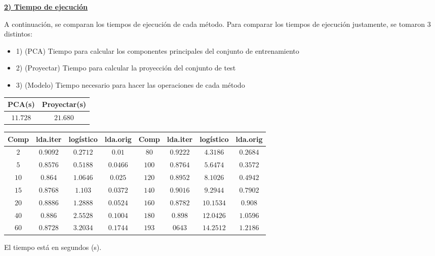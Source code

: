 \underline{\textbf{2) Tiempo de ejecución}}

A continuación, se comparan los tiempos de ejecución de cada método. Para comparar los tiempos de ejecución justamente, se tomaron 3 distintos:

\begin{itemize}
\item 1) (PCA) Tiempo para calcular los componentes principales del conjunto de entrenamiento
\item 2) (Proyectar) Tiempo para calcular la proyección del conjunto de test
\item 3) (Modelo) Tiempo necesario para hacer las operaciones de cada método

\end{itemize}

\begin{center}
\begin{tabular}{ | c | c |} 
\hline
 PCA(s) & Proyectar(s) \\ 
\hline
\hline
$11.728$ & $21.680$ \\ 
\hline
\hline
\end{tabular}
\end{center}


\begin{center}
\begin{tabular}{ | c | c | c | c | c | c | c | c |} 
\hline
Comp & lda.iter & logístico & lda.orig   & Comp & lda.iter & logístico & lda.orig   \\ 
\hline
\hline
$2$ & $0.9092$ & $0.2712$ & $0.01$ & $80$ & $0.9222$ & $4.3186$ & $0.2684$ \\
$5$ & $0.8576$ & $0.5188$ & $0.0466$ & $100$ & $0.8764$ & $5.6474$ & $0.3572$ \\
$10$ & $0.864$ & $1.0646$ & $0.025$ & $120$ & $0.8952$ & $8.1026$ & $0.4942$ \\
$15$ & $0.8768$ & $1.103$ & $0.0372$ & $140$ & $0.9016$ & $9.2944$ & $0.7902$ \\
$20$ & $0.8886$ & $1.2888$ & $0.0524$ & $160$ & $0.8782$ & $10.1534$ & $0.908$ \\
$40$ & $0.886$ & $2.5528$ & $0.1004$ & $180$ & $0.898$ & $12.0426$ & $1.0596$ \\
$60$ & $0.8728$ & $3.2034$ & $0.1744$ & $193$ & $0643$ & $14.2512$ & $1.2186$ \\
\hline
\hline
\end{tabular}
\end{center}

El tiempo está en segundos (s).

